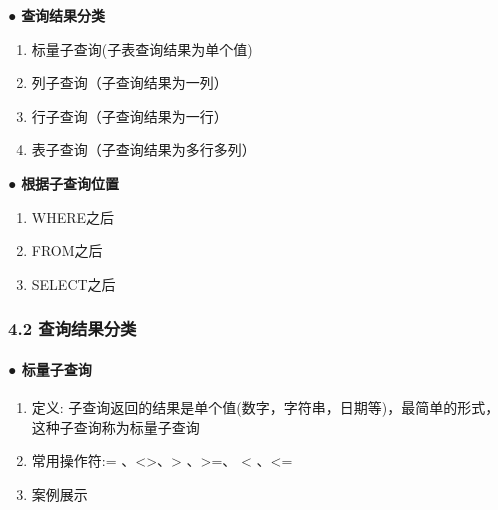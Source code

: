 \documentclass[
  letterpaper,
  DIV=11,
  numbers=noendperiod]{scrreprt}
\let\oldparagraph\paragraph
\renewcommand{\paragraph}[1]{\oldparagraph{#1}\mbox{}}
\providecommand{\tightlist}{%
  \setlength{\itemsep}{0pt}\setlength{\parskip}{0pt}}\usepackage{longtable,booktabs,array}
\begin{document}
\hspace{0pt} ● \textbf{查询结果分类}

\begin{enumerate}
\def\labelenumi{\arabic{enumi}.}
\tightlist
\item
  标量子查询(子表查询结果为单个值)
\item
  列子查询（子查询结果为一列）
\item
  行子查询（子查询结果为一行）
\item
  表子查询（子查询结果为多行多列）
\end{enumerate}

\hspace{0pt} ● \textbf{根据子查询位置}

\begin{enumerate}
\def\labelenumi{\arabic{enumi}.}
\tightlist
\item
  WHERE之后
\item
  FROM之后
\item
  SELECT之后
\end{enumerate}

\hypertarget{ux67e5ux8be2ux7ed3ux679cux5206ux7c7b}{%
\subsubsection{\texorpdfstring{\textbf{4.2}
\textbf{查询结果分类}}{4.2 查询结果分类}}\label{ux67e5ux8be2ux7ed3ux679cux5206ux7c7b}}

\hypertarget{ux6807ux91cfux5b50ux67e5ux8be2}{%
\paragraph{\texorpdfstring{\textbf{●
标量子查询}}{● 标量子查询}}\label{ux6807ux91cfux5b50ux67e5ux8be2}}

\begin{enumerate}
\def\labelenumi{\arabic{enumi}.}
\tightlist
\item
  定义:
  子查询返回的结果是单个值(数字，字符串，日期等)，最简单的形式，这种子查询称为标量子查询
\item
  常用操作符:= 、\textless\textgreater、\textgreater{} 、\textgreater=、
  \textless{} 、\textless=
\item
  案例展示
\end{enumerate}
\end{document}
